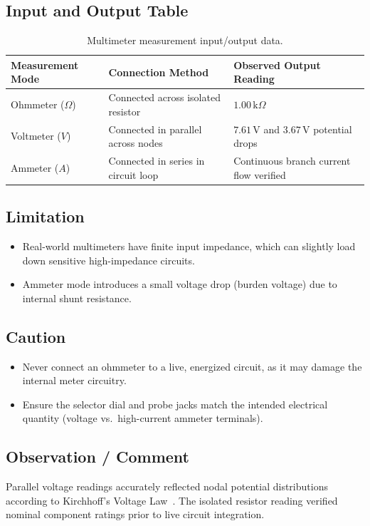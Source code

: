 \documentclass[11pt,a4paper]{article}
\begin{document}
\subsection{Input and Output Table}
\begin{table}[H]
    \centering
    \caption{Multimeter measurement input/output data.}
    \label{tab:part2_io}
    \begin{tabularx}{\textwidth}{@{}l L L@{}}
        \toprule
        \textbf{Measurement Mode} & \textbf{Connection Method} & \textbf{Observed Output Reading} \\
        \midrule
        Ohmmeter ($\Omega$) & Connected across isolated resistor & $1.00\,\text{k}\Omega$ \\
        Voltmeter ($V$) & Connected in parallel across nodes & $7.61\,\text{V}$ and $3.67\,\text{V}$ potential drops \\
        Ammeter ($A$) & Connected in series in circuit loop & Continuous branch current flow verified \\
        \bottomrule
    \end{tabularx}
\end{table}

\subsection{Limitation}
\begin{itemize}
    \item Real-world multimeters have finite input impedance, which can slightly load down sensitive high-impedance circuits.
    \item Ammeter mode introduces a small voltage drop (burden voltage) due to internal shunt resistance.
\end{itemize}

\subsection{Caution}
\begin{itemize}
    \item Never connect an ohmmeter to a live, energized circuit, as it may damage the internal meter circuitry.
    \item Ensure the selector dial and probe jacks match the intended electrical quantity (voltage vs.\ high-current ammeter terminals).
\end{itemize}

\subsection{Observation / Comment}
Parallel voltage readings accurately reflected nodal potential distributions according to Kirchhoff's Voltage Law~\cite{ref_boylestad}. The isolated resistor reading verified nominal component ratings prior to live circuit integration.
\end{document}
